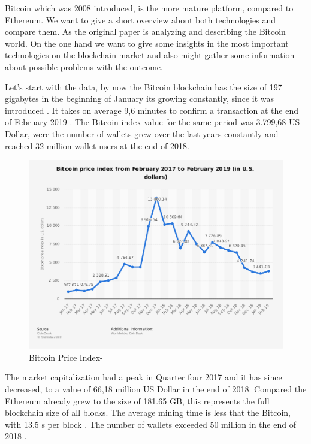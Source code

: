 Bitcoin which was 2008 introduced, is the more mature platform, compared to Ethereum. 
We want to give a short overview about both technologies and compare them. As the original paper is analyzing and describing the Bitcoin world. 
On the one hand we want to give some insights in the most important technologies on the blockchain market and also might gather some information about possible problems with the outcome. 

Let’s start with the data, by now the Bitcoin blockchain has the size of 197 gigabytes in the beginning of January its growing constantly, since it was introduced \cite{StatBit1}.
It takes on average 9,6 minutes to confirm a transaction at the end of February 2019 \cite{StatBit1}. 
The Bitcoin index value for the same period was 3.799,68 US Dollar, were the number of wallets grew over the last years constantly and reached 32 million wallet users at the end of 2018.

\begin{figure}[h]
  \centering
  \includegraphics[width=\linewidth]{figures/marketBit.png}
  \caption{Bitcoin Price Index- \cite{StatBit1}}
  \label{fig:marketcapBitcoin}
\end{figure}


The market capitalization had a peak in Quarter four 2017 and it has since decreased, to a value of 66,18 million US Dollar in the end of 2018.
Compared the Ethereum already grew to the size of 181.65 GB, this represents the full blockchain size of all blocks. The average mining time is less that the Bitcoin, with 13.5 s per block \cite{BitInfoEther}. The number of wallets exceeded 50 million in the end of 2018 \cite{BitInfoBitcoin}.

